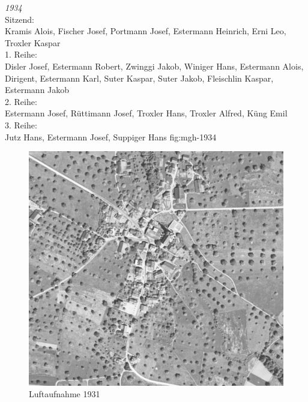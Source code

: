 {\emph{1934}\\
    Sitzend:\\
    Kramis Alois, Fischer Josef, Portmann Josef, Estermann Heinrich, Erni Leo,
    Troxler Kaspar\\
    1. Reihe:\\
    Disler Josef, Estermann Robert, Zwinggi Jakob, Winiger Hans, Estermann
    Alois, Dirigent, Estermann Karl, Suter Kaspar, Suter Jakob, Fleischlin
    Kaspar, Estermann Jakob\\
    2. Reihe:\\
    Estermann Josef, Rüttimann Josef, Troxler Hans, Troxler Alfred, Küng Emil\\
    3. Reihe:\\
    Jutz Hans, Estermann Josef, Suppiger Hans }
{fig:mgh-1934}

\begin{figure}[!htbp]
    \centering
    \includegraphics[height=\textheight,keepaspectratio]{./Dorf-Bilder/Luftaufnahme-1931.jpg}
    \caption{Luftaufnahme 1931}
\end{figure}

